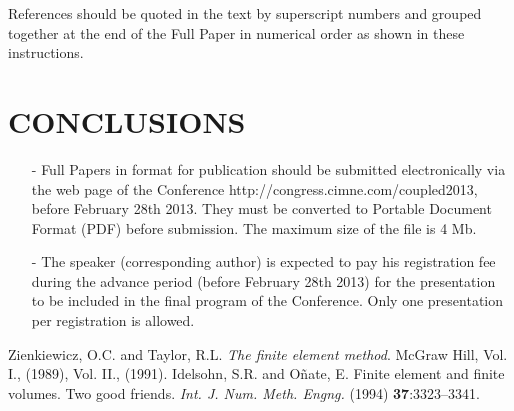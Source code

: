 \documentclass{coupled}
\begin{document}
References should be quoted in the text by superscript
numbers \cite{Zienkiewicz,Idelsohn} and grouped together at the end of the Full Paper in numerical order as shown in these instructions.

\section{CONCLUSIONS}

\begin{itemize}
\item[-] Full Papers in format for publication should be submitted electronically via the web page of the Conference http://congress.cimne.com/coupled2013, before February 28th 2013. They must be converted to  Portable Document Format (PDF) before submission. The maximum size of the file is 4 Mb.

\item[-] The speaker (corresponding author) is expected to pay his registration fee during the advance period (before February 28th 2013) for the presentation to be included in the final program of the Conference. Only one presentation per registration is allowed.
\end{itemize}

\begin{thebibliography}{99}
  Zienkiewicz, O.C. and  Taylor, R.L. \textit{The finite element method}. McGraw Hill,
Vol. I., (1989), Vol. II., (1991).
 Idelsohn, S.R. and O\~{n}ate, E. Finite element and finite volumes. Two good friends.
\textit{Int. J. Num. Meth. Engng.} (1994) \textbf{37}:3323--3341.
\end{thebibliography}
\end{document}
